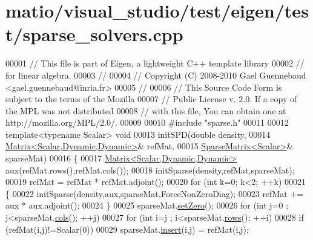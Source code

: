 \hypertarget{matio_2visual__studio_2test_2eigen_2test_2sparse__solvers_8cpp_source}{}\section{matio/visual\+\_\+studio/test/eigen/test/sparse\+\_\+solvers.cpp}
\label{matio_2visual__studio_2test_2eigen_2test_2sparse__solvers_8cpp_source}

\begin{DoxyCode}
00001 \textcolor{comment}{// This file is part of Eigen, a lightweight C++ template library}
00002 \textcolor{comment}{// for linear algebra.}
00003 \textcolor{comment}{//}
00004 \textcolor{comment}{// Copyright (C) 2008-2010 Gael Guennebaud <gael.guennebaud@inria.fr>}
00005 \textcolor{comment}{//}
00006 \textcolor{comment}{// This Source Code Form is subject to the terms of the Mozilla}
00007 \textcolor{comment}{// Public License v. 2.0. If a copy of the MPL was not distributed}
00008 \textcolor{comment}{// with this file, You can obtain one at http://mozilla.org/MPL/2.0/.}
00009 
00010 \textcolor{preprocessor}{#include "sparse.h"}
00011 
00012 \textcolor{keyword}{template}<\textcolor{keyword}{typename} Scalar> \textcolor{keywordtype}{void}
00013 initSPD(\textcolor{keywordtype}{double} density,
00014         \hyperlink{group___core___module}{Matrix<Scalar,Dynamic,Dynamic>}& refMat,
00015         \hyperlink{group___sparse_core___module}{SparseMatrix<Scalar>}& sparseMat)
00016 \{
00017   \hyperlink{group___core___module}{Matrix<Scalar,Dynamic,Dynamic>} aux(refMat.rows(),refMat.cols());
00018   initSparse(density,refMat,sparseMat);
00019   refMat = refMat * refMat.adjoint();
00020   \textcolor{keywordflow}{for} (\textcolor{keywordtype}{int} k=0; k<2; ++k)
00021   \{
00022     initSparse(density,aux,sparseMat,ForceNonZeroDiag);
00023     refMat += aux * aux.adjoint();
00024   \}
00025   sparseMat.\hyperlink{group___sparse_core___module_ad3c7416090f913e8685523cb3ab7c2f7}{setZero}();
00026   \textcolor{keywordflow}{for} (\textcolor{keywordtype}{int} j=0 ; j<sparseMat.\hyperlink{group___sparse_core___module_aa391750e3c530227e4a5c3c52e959975}{cols}(); ++j)
00027     \textcolor{keywordflow}{for} (\textcolor{keywordtype}{int} i=j ; i<sparseMat.\hyperlink{group___sparse_core___module_a62e61bb861eee306d5b069ce652b5aa5}{rows}(); ++i)
00028       \textcolor{keywordflow}{if} (refMat(i,j)!=Scalar(0))
00029         sparseMat.\hyperlink{group___sparse_core___module_aae45e3b5fec7f6a0cdd10eec7c6d3666}{insert}(i,j) = refMat(i,j);

\end{DoxyCode}
